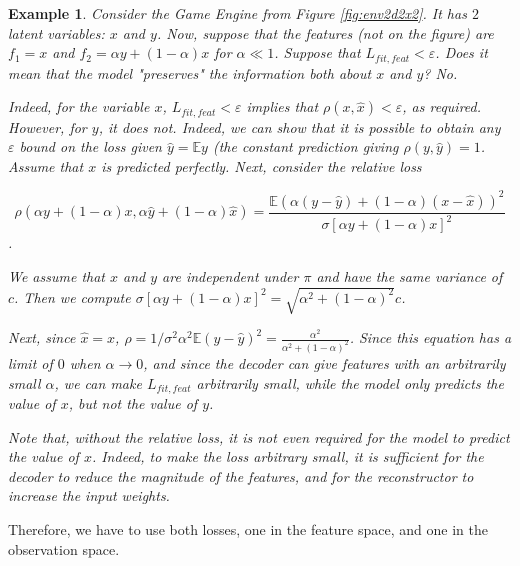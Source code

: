 \documentclass[a4paper,11pt,oneside]{report}
\newtheorem{example}{Example}[section]
\begin{document}
\begin{example}
Consider the Game Engine from Figure \ref{fig:env2d2x2}. It has $2$ latent variables: $x$ and $y$. Now, suppose that the features (not on the figure) are $f_1=x$ and $f_2=\alpha y+(1-\alpha)x$ for $\alpha \ll 1$. Suppose that $L_{fit, feat}<\varepsilon$. Does it mean that the model "preserves" the information both about $x$ and $y$? No.

Indeed, for the variable $x$, $L_{fit, feat}<\varepsilon$ implies that $\rho(x,\hat{x})<\varepsilon$, as required. However, for $y$, it does not. Indeed, we can show that it is possible to obtain any $\varepsilon$ bound on the loss given $\hat{y}=\mathbb E y$ (the constant prediction giving $\rho(y,\hat{y})=1$. Assume that $x$ is predicted perfectly. Next, consider the relative loss

$$\rho(\alpha y+(1-\alpha)x,\alpha \hat{y}+(1-\alpha)\hat{x})=\frac{\mathbb E \left(\alpha(y-\hat{y})+(1-\alpha)(x-\hat{x})\right)^2}{\sigma[\alpha y+(1-\alpha)x]^2}$$.

We assume that $x$ and $y$ are independent under $\pi$ and have the same variance of $c$. Then we compute $\sigma[\alpha y+(1-\alpha)x]^2=\sqrt{\alpha^2+(1-\alpha)^2}c$.

Next, since $\hat{x}=x$, $\rho=1/\sigma^2\alpha^2\mathbb E(y-\hat{y})^2=\frac{\alpha^2}{\alpha^2+(1-\alpha)^2}$. Since this equation has a limit of $0$ when $\alpha\to 0$, and since the decoder can give features with an arbitrarily small $\alpha$, we can make $L_{fit, feat}$ arbitrarily small, while the model only predicts the value of $x$, but not the value of $y$.

Note that, without the relative loss, it is not even required for the model to predict the value of $x$. Indeed, to make the loss arbitrary small, it is sufficient for the decoder to reduce the magnitude of the features, and for the reconstructor to increase the input weights.
\end{example}

Therefore, we have to use both losses, one in the feature space, and one in the observation space.
\end{document}
